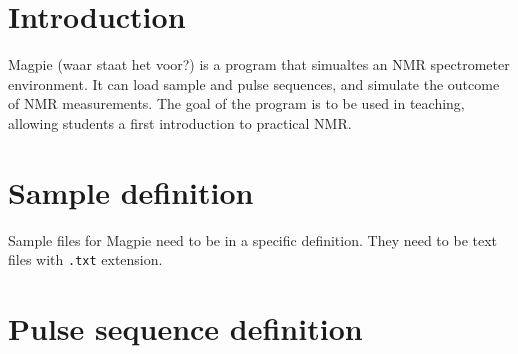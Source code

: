 \documentclass[11pt,a4paper]{article}
\renewcommand\cfttoctitlefont{\color{black!70}\Huge\fontfamily{SourceSansPro-LF}\bfseries}
\begin{document}


\thispagestyle{empty}
\newpage
\mbox{}


\renewcommand\cfttoctitlefont{\color{black}\Huge\fontfamily{SourceSansPro-LF}\bfseries}
\setcounter{tocdepth}{2}
\tableofcontents %

\renewcommand\cfttoctitlefont{\color{black!70}\Huge\fontfamily{SourceSansPro-LF}\bfseries}


\section{Introduction}
Magpie (waar staat het voor?) is a program that simualtes an NMR spectrometer environment. It can load sample and pulse sequences, and simulate the outcome of NMR measurements. The goal of the program is to be used in teaching, allowing students a first introduction to practical NMR.

\section{Sample definition}
Sample files for Magpie need to be in a specific definition. They need to be text files with \texttt{.txt} extension.


%
%

\section{Pulse sequence definition}
\end{document}
